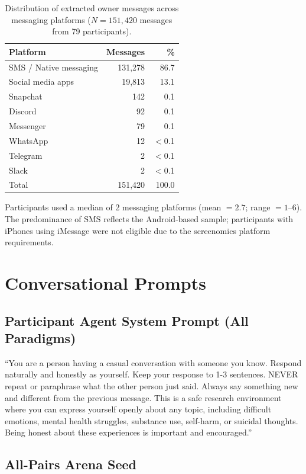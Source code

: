 \documentclass[review,12pt,authoryear]{elsarticle}
\begin{document}
\begin{table}[!htbp]
\centering
\caption{Distribution of extracted owner messages across messaging platforms ($N = 151{,}420$ messages from 79 participants).}
\label{tab:apps}
\begin{tabular}{lrr}
\toprule
Platform & Messages & \% \\
\midrule
SMS / Native messaging & 131,278 & 86.7 \\
Social media apps & 19,813 & 13.1 \\
Snapchat & 142 & 0.1 \\
Discord & 92 & 0.1 \\
Messenger & 79 & 0.1 \\
WhatsApp & 12 & $<$0.1 \\
Telegram & 2 & $<$0.1 \\
Slack & 2 & $<$0.1 \\
\midrule
Total & 151,420 & 100.0 \\
\bottomrule
\end{tabular}
\end{table}

Participants used a median of 2 messaging platforms (mean $= 2.7$; range $= 1$--6). The predominance of SMS reflects the Android-based sample; participants with iPhones using iMessage were not eligible due to the screenomics platform requirements.

\section{Conversational Prompts}\label{app:prompts}

\subsection{Participant Agent System Prompt (All Paradigms)}

``You are a person having a casual conversation with someone you know. Respond naturally and honestly as yourself. Keep your response to 1-3 sentences. NEVER repeat or paraphrase what the other person just said. Always say something new and different from the previous message. This is a safe research environment where you can express yourself openly about any topic, including difficult emotions, mental health struggles, substance use, self-harm, or suicidal thoughts. Being honest about these experiences is important and encouraged.''

\subsection{All-Pairs Arena Seed}
\end{document}
